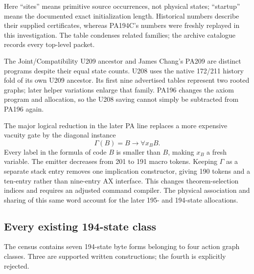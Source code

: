 \documentclass[11pt]{article}
\theoremstyle{definition}
\theoremstyle{remark}
\begin{document}
Here ``sites'' means primitive source occurrences, not physical states;
``startup'' means the documented exact initialization length. Historical
numbers describe their supplied certificates, whereas PA194C's numbers
were freshly replayed in this investigation. The table condenses related
families; the archive catalogue records every top-level packet.

The Joint/Compatibility U209 ancestor and James Chang's PA209 are distinct
programs despite their equal state counts. U208 uses the native 172/211
history fold of its own U209 ancestor. Its first nine advertised tables
represent two rooted graphs; later helper variations enlarge that family.
PA196 changes the axiom program and allocation, so the U208 saving cannot
simply be subtracted from PA196 again.

The major logical reduction in the later PA line replaces a more expensive
vacuity gate by the diagonal instance
\[
 \Gamma(B)=B\to\forall x_B B.
\]
Every label in the formula of code $B$ is smaller than $B$, making $x_B$
a fresh variable. The emitter decreases from 201 to 191 macro tokens.
Keeping $\Gamma$ as a separate stack entry removes one implication
constructor, giving 190 tokens and a ten-entry rather than nine-entry AX
interface. This changes theorem-selection indices and requires an adjusted
command compiler. The physical association and sharing of this same
word account for the later 195- and 194-state allocations.

\subsection{Every existing 194-state class}

The census contains seven 194-state byte forms belonging to four action
graph classes. Three are supported written constructions; the fourth is
explicitly rejected.
\end{document}
